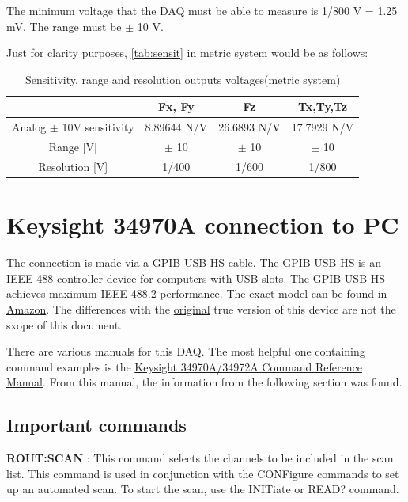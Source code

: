 \documentclass[a4paper]{article}
\begin{document}
The minimum voltage that the DAQ must be able to measure is 1/800 V = 1.25 mV. The range must be $\pm$ 10 V.

Just for clarity purposes, \autoref{tab:sensit} in metric system would be as follows:

\begin{table}[h!]
	\centering
	\caption{Sensitivity, range and resolution outputs voltages\label{tab:sensit2} (metric system)}
	\begin{tabular}{||c | c | c | c ||} 
		\hline
		& Fx, Fy & Fz & Tx,Ty,Tz \\ [0.5ex] 
		\hline\hline
		Analog $\pm$ 10V sensitivity & 8.89644 N/V & 26.6893 N/V & 17.7929 N/V\\ 
		\hline
		Range [V] & $\pm$ 10 & $\pm$ 10 & $\pm$ 10 \\
		\hline
		Resolution [V] & 1/400 & 1/600 & 1/800 \\
		\hline
	\end{tabular}
\end{table}


\section{Keysight 34970A connection to PC}
The connection is made via a GPIB‑USB‑HS cable. The GPIB‑USB‑HS is an IEEE 488 controller device for computers with USB slots. The GPIB‑USB‑HS achieves maximum IEEE 488.2 performance. The exact model can be found in \hyperref{https://www.amazon.com/Kanonaki-GPIB-USB-HS-Interface-Adapter-Controller/dp/B07Q84XJJF}{category}{name}{Amazon}. The differences with the \hyperref{https://www.newark.com/ni/780570-01/gpib-usb-hs-gpib-control-device/dp/14AJ5119}{category}{name}{original} true version of this device are not the sxope of this document. 

There are various manuals for this DAQ. The most helpful one containing command examples is the \href{https://documentation.help/Keysight-34970A-34972A/documentation.pdf}{Keysight 34970A/34972A Command Reference Manual}. From this manual, the information from the following section was found.

\subsection{Important commands}

\textbf{ROUT:SCAN} : This command selects the channels to be included in the scan list. This command is used in conjunction with the CONFigure commands to set up an automated scan. To start the scan, use the INITiate or READ? command.
\end{document}

